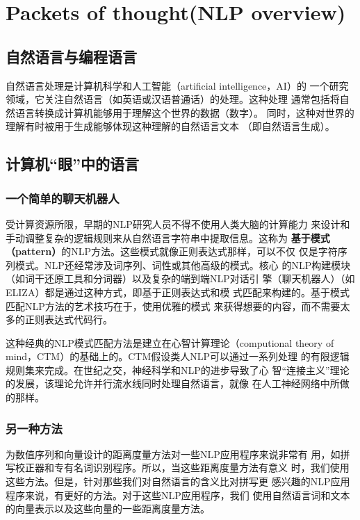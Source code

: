 \chapter{Packets of thought(NLP overview)\label{Ch01}}
\section{自然语言与编程语言}

\begin{definition}
    自然语言处理是计算机科学和人工智能（artificial intelligence，AI）的
    一个研究领域，它关注自然语言（如英语或汉语普通话）的处理。这种处理
    通常包括将自然语言转换成计算机能够用于理解这个世界的数据（数字）。
    同时，这种对世界的理解有时被用于生成能够体现这种理解的自然语言文本
    （即自然语言生成）。
\end{definition}

\section{计算机“眼”中的语言}
\subsection{一个简单的聊天机器人}

受计算资源所限，早期的NLP研究人员不得不使用人类大脑的计算能力
来设计和手动调整复杂的逻辑规则来从自然语言字符串中提取信息。这称为
\textbf{基于模式（pattern）}的NLP方法。这些模式就像正则表达式那样，可以不仅
仅是字符序列模式。NLP还经常涉及词序列、词性或其他高级的模式。核心
的NLP构建模块（如词干还原工具和分词器）以及复杂的端到端NLP对话引
擎（聊天机器人）（如ELIZA）都是通过这种方式，即基于正则表达式和模
式匹配来构建的。基于模式匹配NLP方法的艺术技巧在于，使用优雅的模式
来获得想要的内容，而不需要太多的正则表达式代码行。

\begin{tcolorbox}[title=经典心智计算理论]
    这种经典的NLP模式匹配方法是建立在心智计算理论（computional
    theory of mind，CTM）的基础上的。CTM假设类人NLP可以通过一系列处理
    的有限逻辑规则集来完成。在世纪之交，神经科学和NLP的进步导致了心
    智“连接主义”理论的发展，该理论允许并行流水线同时处理自然语言，就像
    在人工神经网络中所做的那样。
\end{tcolorbox}
\subsection{另一种方法}
为数值序列和向量设计的距离度量方法对一些NLP应用程序来说非常有
用，如拼写校正器和专有名词识别程序。所以，当这些距离度量方法有意义
时，我们使用这些方法。但是，针对那些我们对自然语言的含义比对拼写更
感兴趣的NLP应用程序来说，有更好的方法。对于这些NLP应用程序，我们
使用自然语言词和文本的向量表示以及这些向量的一些距离度量方法。

